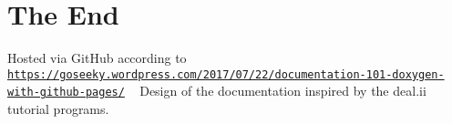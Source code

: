 \hypertarget{index_END}{}\section{The End}\label{index_END}
Hosted via Git\+Hub according to \href{https://goseeky.wordpress.com/2017/07/22/documentation-101-doxygen-with-github-pages/}{\tt https\+://goseeky.\+wordpress.\+com/2017/07/22/documentation-\/101-\/doxygen-\/with-\/github-\/pages/} ~\newline
Design of the documentation inspired by the deal.\+ii tutorial programs. 